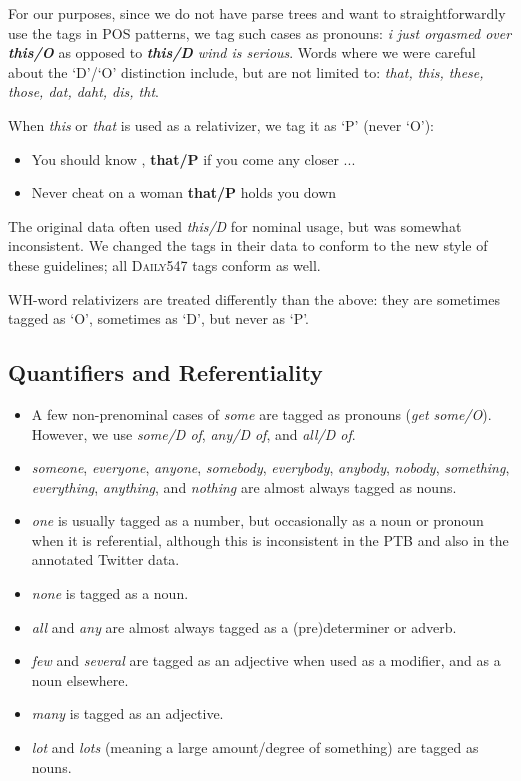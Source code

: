 \documentclass[11pt,letterpaper]{article}
\begin{document}
\noindent For our purposes, since we do not have parse trees and want to straightforwardly use the tags 
in POS patterns, we tag such cases as pronouns:
\emph{i just orgasmed over \textbf{this/O}}
as opposed to
\emph{\textbf{this/D} wind is serious}.
Words where we were careful about the `D'/`O' distinction include, but are not limited 
to: \emph{that, this, these, those, dat, daht, dis, tht}.

When \emph{this} or \emph{that} is used as a relativizer, we tag it as `P' (never `O'):
\begin{itemize}
\item You should know , \textbf{that/P} if you come any closer ...
\item Never cheat on a woman \textbf{that/P} holds you down
\end{itemize}

The original  data often used \emph{this/D} for nominal usage, but was somewhat inconsistent. We changed the tags in their data to conform to the new style of these guidelines; all \textsc{Daily547} tags conform as well.

WH-word relativizers are treated differently than the above: they are sometimes tagged as `O', sometimes as `D', but never as `P'.

\subsection{Quantifiers and Referentiality}

\begin{itemize}
\item A few non-prenominal cases of \emph{some} are tagged as pronouns (\emph{get some/O}). However, we use \emph{some/D of}, \emph{any/D of}, and \emph{all/D of}.
\item \emph{someone}, \emph{everyone}, \emph{anyone}, \emph{somebody}, \emph{everybody}, \emph{anybody}, \emph{nobody}, \emph{something}, \emph{everything}, \emph{anything}, and \emph{nothing} are almost always tagged as nouns.
\item \emph{one} is usually tagged as a number, but occasionally as a noun or pronoun when it is referential, although this is inconsistent in the PTB and also in the annotated Twitter data.
\item \emph{none} is tagged as a noun.
\item \emph{all} and \emph{any} are almost always tagged as a (pre)determiner or adverb.
\item \emph{few} and \emph{several} are tagged as an adjective when used as a modifier, and as a noun elsewhere.
\item \emph{many} is tagged as an adjective.
\item \emph{lot} and \emph{lots} (meaning a large amount/degree of something) are tagged as nouns.
\end{itemize}
\end{document}
